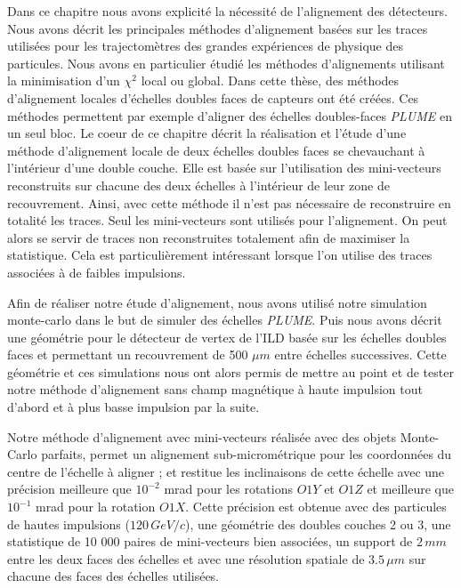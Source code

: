   Dans ce chapitre nous avons explicit\'e la n\'ecessité de l'alignement des d\'etecteurs. Nous avons d\'ecrit les principales m\'ethodes d'alignement bas\'ees sur les traces utilis\'ees pour les trajectom\`etres des grandes exp\'eriences de physique des particules. Nous avons en particulier \'etudi\'e les m\'ethodes d'alignements utilisant la minimisation d'un $\chi^2$ local ou global. Dans cette th\`ese, des m\'ethodes d'alignement locales d'\'echelles doubles faces de capteurs ont \'et\'e cr\'e\'ees. Ces m\'ethodes permettent par exemple d'aligner des \'echelles doubles-faces \textit{PLUME} en un seul bloc. Le coeur de ce chapitre d\'ecrit la r\'ealisation et l'\'etude d'une m\'ethode d'alignement locale de deux \'echelles doubles faces se chevauchant \`a l'int\'erieur d'une double couche. Elle est bas\'ee sur l'utilisation des mini-vecteurs reconstruits sur chacune des deux \'echelles \`a l'intérieur de leur zone de recouvrement. Ainsi, avec cette m\'ethode il n'est pas n\'ecessaire de reconstruire en totalit\'e les traces. Seul les mini-vecteurs sont utilis\'es pour l'alignement. On peut alors se servir de traces non reconstruites totalement afin de maximiser la statistique. Cela est particuli\`erement int\'eressant lorsque l'on utilise des traces associ\'ees \`a de faibles impulsions.
  
  \medskip

  Afin de r\'ealiser notre \'etude d'alignement, nous avons utilis\'e notre simulation monte-carlo dans le but de simuler des \'echelles \textit{PLUME}. Puis nous avons d\'ecrit une g\'eom\'etrie pour le d\'etecteur de vertex de l'ILD bas\'ee sur les \'echelles doubles faces et permettant un recouvrement de 500 $\mu m$ entre \'echelles successives. Cette g\'eom\'etrie et ces simulations nous ont alors permis de mettre au point et de tester notre m\'ethode d'alignement sans champ magn\'etique \`a haute impulsion tout d'abord et \`a plus basse impulsion par la suite.
  
  
  \medskip
  
  Notre m\'ethode d'alignement avec mini-vecteurs r\'ealis\'ee avec des objets Monte-Carlo parfaits, permet un alignement sub-microm\'etrique pour les coordonn\'ees du centre de l'\'echelle \`a aligner ; et restitue les inclinaisons de cette \'echelle avec une pr\'ecision meilleure que $10^{-2}$ mrad pour les rotations $O1Y$ et $O1Z$ et meilleure que $10^{-1}$ mrad pour la rotation $O1X$. Cette pr\'ecision est obtenue avec des particules de hautes impulsions ($120 \, GeV/c$), une g\'eom\'etrie des doubles couches 2 ou 3, une statistique de 10 000 paires de mini-vecteurs bien associ\'ees, un support de $2 \, mm$ entre les deux faces des \'echelles et avec une r\'esolution spatiale de $3.5 \, \mu m$ sur chacune des faces des \'echelles utilis\'ees.
  
